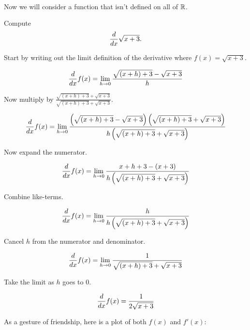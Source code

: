 \documentclass{ximera}
\begin{document}
Now we will consider a function that isn't defined on all of $\mathbb R$.

\begin{example}
Compute 
\[
\frac{d}{dx} \sqrt{x+3}.
\]

Start by writing out the limit definition of the derivative where
$f(x) = \sqrt{x+3}$.
\begin{freeResponse}[given]
\[
\frac{d}{dx} f(x) = \lim_{h\to 0}\frac{\sqrt{(x+h)+3} - \sqrt{x+3}}{h}
\]
\end{freeResponse}
Now multiply by $\frac{\sqrt{(x+h)+3} + \sqrt{x+3}}{\sqrt{(x+h)+3} + \sqrt{x+3}}$.
\begin{freeResponse}[given]
\[
\frac{d}{dx} f(x) = \lim_{h\to 0}\frac{\left(\sqrt{(x+h)+3} - \sqrt{x+3}\right)\left(\sqrt{(x+h)+3} + \sqrt{x+3}\right)}{h\left(\sqrt{(x+h)+3} + \sqrt{x+3}\right)}
\]
\end{freeResponse}
Now expand the numerator.
\begin{freeResponse}[given]
\[
\frac{d}{dx} f(x) = \lim_{h\to 0}\frac{x+h+3 - (x+3)}{h\left(\sqrt{(x+h)+3} + \sqrt{x+3}\right)}
\]
\end{freeResponse}
Combine like-terms.
\begin{freeResponse}[given]
\[
\frac{d}{dx} f(x) = \lim_{h\to 0}\frac{h}{h\left(\sqrt{(x+h)+3} + \sqrt{x+3}\right)}
\]
\end{freeResponse}
Cancel $h$ from the numerator and denominator.
\begin{freeResponse}[given]
\[
\frac{d}{dx} f(x) = \lim_{h\to 0}\frac{1}{\sqrt{(x+h)+3} + \sqrt{x+3}}
\]
\end{freeResponse}
Take the limit as $h$ goes to $0$. 
\begin{freeResponse}[given]
\[
\frac{d}{dx} f(x) = \frac{1}{2\sqrt{x+3}}
\]
\end{freeResponse}
As a gesture of friendship, here is a plot of both $f(x)$ and $f'(x)$:
\begin{image}
\end{image}
\end{example}
\end{document}
